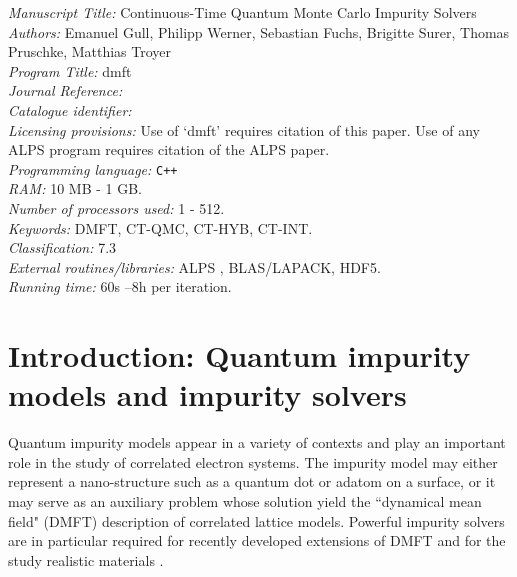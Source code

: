 \documentclass[3p,twocolumn]{elsarticle}
\begin{document}
\begin{small}
\noindent
{\em Manuscript Title:} Continuous-Time Quantum Monte Carlo Impurity Solvers \\ 
{\em Authors:} Emanuel Gull, Philipp Werner, Sebastian Fuchs, Brigitte Surer, Thomas Pruschke, Matthias Troyer\\ 
{\em Program Title:} dmft \\
{\em Journal Reference:}                                      \\
{\em Catalogue identifier:}                                   \\
{\em Licensing provisions:} Use of `dmft' requires citation of this paper. Use of any ALPS program requires citation of the ALPS \cite{ALPS} paper.\\
{\em Programming language:} \verb*#C++# \\
{\em RAM:} 10 MB - 1 GB.\\ 
{\em Number of processors used:} 1 - 512.\\ 
{\em Keywords:} DMFT, CT-QMC, CT-HYB, CT-INT.\\ 
{\em Classification:} 7.3 \\ 
{\em External routines/libraries:}  ALPS \cite{ALPS}, BLAS/LAPACK, HDF5.\\ 
{\em Running time:} 60s --8h per iteration.\\
\end{small}
\section{Introduction: Quantum impurity models and impurity solvers}
Quantum impurity models appear in a variety of contexts and play an important role in the study of correlated electron systems. The impurity model may either represent a nano-structure such as a quantum dot or adatom on a surface, or it may serve as an auxiliary problem whose solution yield the ``dynamical mean field" (DMFT) \cite{Georges96,Pruschke95} description of correlated lattice models. Powerful impurity solvers are in particular required for recently developed extensions of DMFT \cite{Maier05,Rubtsov08} and for the study realistic materials \cite{Kotliar06}.
\end{document}
